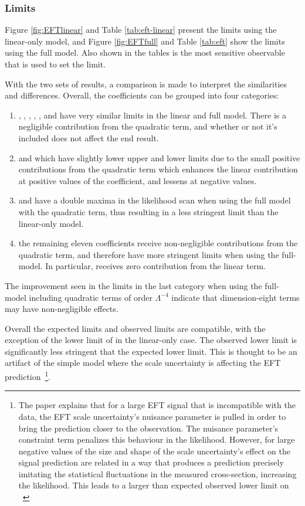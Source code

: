 \subsubsection{Limits}
Figure \ref{fig:EFTlinear} and Table \ref{tab:eft-linear} present the limits using the linear-only model, and Figure \ref{fig:EFTfull} and Table \ref{tab:eft} show the limits using the full model. Also shown in the tables is the most sensitive observable that is used to set the limit.

With the two sets of results, a comparison is made to interpret the similarities and differences. Overall, the coefficients can be grouped into four categories:
\begin{enumerate}
    \item \chdd, \chwb, \che, \chlone, \chqthr{}, \chlthr{} and \cllone{} have very similar limits in the linear and full model. There is a negligible contribution from the quadratic term, and whether or not it's included does not affect the end result. 
    \item \chqone{} and \clqthr{} which have slightly lower upper and lower limits  due to the small positive contributions from the quadratic term which enhances the linear contribution at positive values of the coefficient, and lessens at negative values.
    \item \chg{} and \chu have a double maxima in the likelihood scan when using the full model with the quadratic term, thus resulting in a less stringent limit than the linear-only model.
    \item the remaining eleven coefficients receive non-negligible contributions from the quadratic term, and therefore have more stringent limits when using the full-model. In particular, \chgtil{} receives zero contribution from the linear term.
\end{enumerate}
The improvement seen in the limits in the last category when using the full-model including quadratic terms of order $\Lambda^{-4}$ indicate that dimension-eight terms may have non-negligible effects.

Overall the expected limits and observed limits are compatible, with the exception of the lower limit of \clqone{} in the linear-only case. The observed lower limit is significantly less stringent that the expected lower limit. This is thought to be an artifact of the simple model where the scale uncertainty is affecting the EFT prediction~\cite{m4l2021_paper}\footnote{The paper explains that for a large EFT signal that is incompatible with the data,
the EFT scale uncertainty's nuisance parameter is pulled in order to
bring the prediction closer to the observation. The nuisance parameter's constraint term 
penalizes this behaviour in the likelihood.
However, for large negative values of \clqone{} the size and shape of
the scale uncertainty's effect on the signal prediction
are related in a way that produces a prediction precisely imitating the
statistical fluctuations in the measured cross-section, increasing the likelihood.
This leads to a larger than expected observed lower limit on \clqone~\cite{m4l2021_paper}}.

